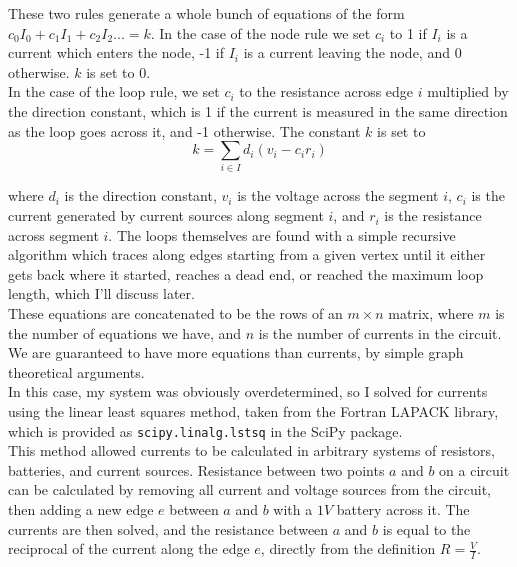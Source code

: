 \documentclass[11pt]{article}
\begin{document}
These two rules generate a whole bunch of equations of the form $c_0I_0+c_1I_1+c_2I_2 ... = k$. In the case of the node rule we set $c_i$ to 1 if $I_i$ is a current which enters the node, -1 if $I_i$ is a current leaving the node, and 0 otherwise. $k$ is set to 0.\\

In the case of the loop rule, we set $c_i$ to the resistance across edge $i$ multiplied by the direction constant, which is 1 if the current is measured in the same direction as the loop goes across it, and -1 otherwise. The constant $k$ is set to\\

\begin{equation*}
k= \sum_{i\in I} d_i (v_i - c_i r_i )
\end{equation*}

where $d_i$ is the direction constant, $v_i$ is the voltage across the segment $i$, $c_i$ is the current generated by current sources along segment $i$, and $r_i$ is the resistance across segment $i$. The loops themselves are found with a simple recursive algorithm which traces along edges starting from a given vertex until it either gets back where it started, reaches a dead end, or reached the maximum loop length, which I'll discuss later.\\

These equations are concatenated to be the rows of an $m\times n$ matrix, where $m$ is the number of equations we have, and $n$ is the number of currents in the circuit. We are guaranteed to have more equations than currents, by simple graph theoretical arguments.\\

In this case, my system was obviously overdetermined, so I solved for currents using the linear least squares method, taken from the Fortran LAPACK library, which is provided as \texttt{scipy.linalg.lstsq} in the SciPy package.\\

This method allowed currents to be calculated in arbitrary systems of resistors, batteries, and current sources. Resistance between two points $a$ and $b$ on a circuit can be calculated by removing all current and voltage sources from the circuit, then adding a new edge $e$ between $a$ and $b$ with a $1V$ battery across it. The currents are then solved, and the resistance between $a$ and $b$ is equal to the reciprocal of the current along the edge $e$, directly from the definition $R=\frac{V}{I}$.\\
\end{document}
